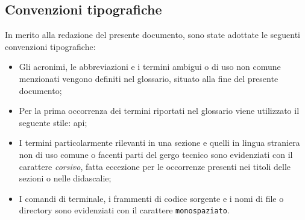 \subsection{Convenzioni tipografiche}
\label{sec:convenzioni-tipografiche}

In merito alla redazione del presente documento, sono state adottate le seguenti convenzioni tipografiche:
\begin{itemize}
	\item Gli acronimi, le abbreviazioni e i termini ambigui o di uso non comune menzionati vengono definiti nel glossario, situato alla fine del presente documento;

	\item Per la prima occorrenza dei termini riportati nel glossario viene utilizzato il seguente stile: \gls{api}\glsfirstoccur{};

	\item I termini particolarmente rilevanti in una sezione e quelli in lingua straniera non di uso comune o facenti parti del gergo tecnico sono evidenziati con il carattere \emph{corsivo}, fatta eccezione per le occorrenze presenti nei titoli delle sezioni o nelle didascalie;

	\item I comandi di terminale, i frammenti di codice sorgente e i nomi di file o directory sono evidenziati con il carattere \texttt{monospaziato}.

\end{itemize}

